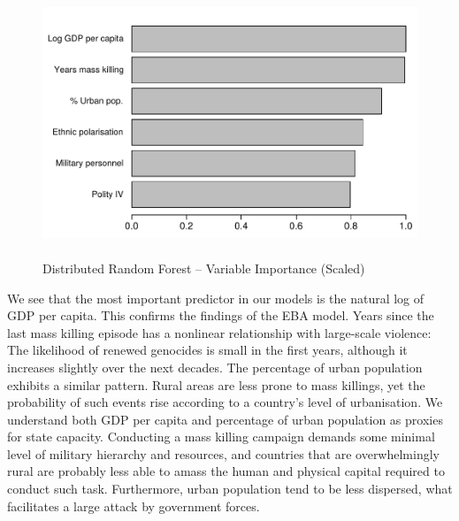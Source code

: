 \begin{figure}[h]
\includegraphics[width=.9\textwidth, height=8cm]{images/drf.pdf}
\caption{Distributed Random Forest -- Variable Importance (Scaled)}
\label{fig:drfuv}
\end{figure}

We see that the most important predictor in our models is the natural log of GDP per capita. This confirms the findings of the EBA model. Years since the last mass killing episode has a nonlinear relationship with large-scale violence: The likelihood of renewed genocides is small in the first years, although it increases slightly over the next decades. The percentage of urban population exhibits a similar pattern. Rural areas are less prone to mass killings, yet the probability of such events rise according to a country’s level of urbanisation. We understand both GDP per capita and percentage of urban population as proxies for state capacity. Conducting a mass killing campaign demands some minimal level of military hierarchy and resources, and countries that are overwhelmingly rural are probably less able to amass the human and physical capital required to conduct such task. Furthermore, urban population tend to be less dispersed, what facilitates a large attack by government forces. 

\vspace{.5cm}

